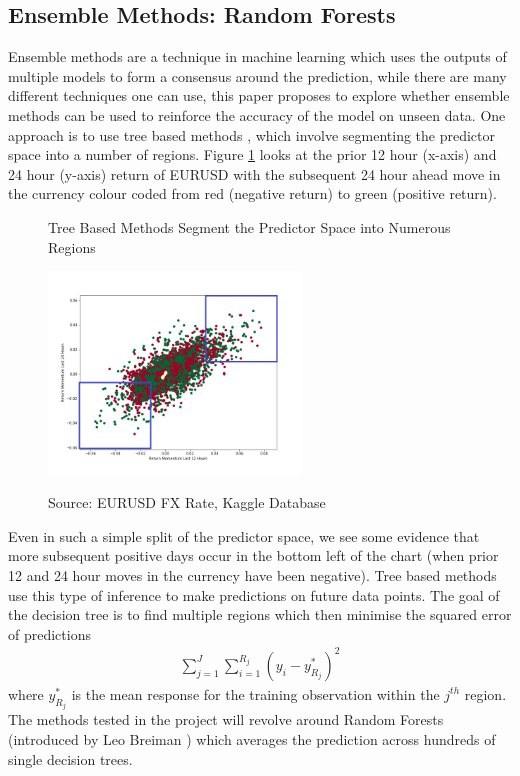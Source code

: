 \documentclass[11pt]{article}
\begin{document}
\subsection{Ensemble Methods: Random Forests}
Ensemble methods are a technique in machine learning which uses the outputs of multiple models to form a consensus around the prediction, while there are many different techniques one can use, this paper proposes to explore whether ensemble methods can be used to reinforce the accuracy of the model on unseen data. One approach is to use tree based methods \cite{Podgorelec2015}, which involve segmenting the predictor space into a number of regions.  Figure \ref{fig:EURUSDMomentum} looks at the prior 12 hour (x-axis) and 24 hour (y-axis) return of EURUSD with the subsequent 24 hour ahead move in the currency colour coded from red (negative return) to green (positive return). 
\begin{figure}[h]
    \centering
	\caption{Tree Based Methods Segment the Predictor Space into Numerous Regions}    
	\includegraphics[width=0.6\textwidth]{EURUSDMomentum}
    \label{fig:EURUSDMomentum}
     \caption*{\small Source: EURUSD FX Rate, Kaggle Database}
\end{figure}
Even in such a simple split of the predictor space, we see some evidence that more subsequent positive days occur in the bottom left of the chart (when prior 12 and 24 hour moves in the currency have been negative). Tree based methods use this type of inference to make predictions on future data points. The goal of the decision tree is to find multiple regions which then minimise the squared error of predictions
\begin{align}
\sum^{J}_{j = 1}\sum^{R_{j}}_{i = 1} (y_{i}-y^{*}_{R_{j}})^{2} 
\end{align}
 where $y^{*}_{R_{j}}$ is the mean response for the training observation within the $j^{th}$ region.
The methods tested in the project will revolve around Random Forests (introduced by Leo Breiman \cite{Breiman2001}) which averages the prediction across hundreds of single decision trees. 
\end{document}
